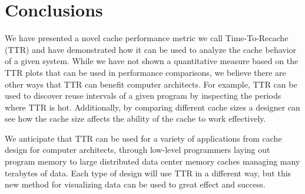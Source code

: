 \section{Conclusions}

We have presented a novel cache performance metric we call 
Time-To-Recache (TTR) and have demonstrated how it can be used to 
analyze the cache behavior of a given system. 
While we have not shown a quantitative measure based on the TTR plots 
that can be used in performance comparisons, we believe there are other
ways that TTR can benefit computer architects. 
For example, TTR can be used to discover reuse intervals of a given
program by inspecting the periods where TTR is hot.
Additionally, by comparing different cache sizes a designer can see
how the cache size affects the ability of the cache to work effectively.

We anticipate that TTR can be used for a variety of applications from cache
design for computer architects, through low-level programmers laying out 
program memory to large distributed data center memory caches managing
many terabytes of data.
Each type of design will use TTR in a different way, but this new method 
for visualizing data can be used to great effect and success.
